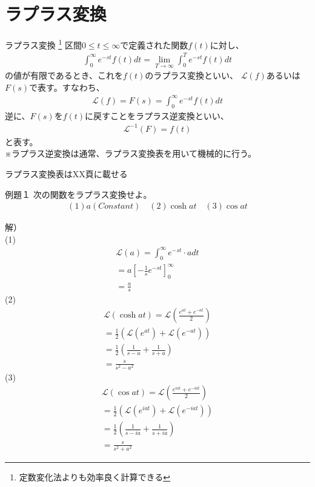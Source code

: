 \documentclass{jsarticle}
\begin{document}
\section{ラプラス変換}
\begin{itembox}[l]{ラプラス変換 \footnote{定数変化法よりも効率良く計算できる}}
区間$0\leq t\leq \infty $で定義された関数$f(t)$に対し、
\begin{eqnarray}
\int_{0}^{\infty}e^{-st}f(t)dt=\lim_{T \to \infty}\int_{0}^{T}e^{-st}f(t)dt
\end{eqnarray}
の値が有限であるとき、これを$f(t)$のラプラス変換といい、
$\mathcal{L}(f)$あるいは$F(s)$で表す。すなわち、
\begin{eqnarray}
\mathcal{L}(f)=F(s)=\int_{0}^{\infty}e^{-st}f(t)dt
\end{eqnarray}
逆に、$F(s)$を$f(t)$に戻すことをラプラス逆変換といい、
\begin{eqnarray}
\mathcal{L}^{-1}(F)=f(t)
\end{eqnarray}
と表す。\\
※ラプラス逆変換は通常、ラプラス変換表を用いて機械的に行う。
\end{itembox}
ラプラス変換表はXX頁に載せる\\
\begin{itembox}[l]{例題１}
次の関数をラプラス変換せよ。
\begin{eqnarray}
(1)a(Constant) \quad
(2)\cosh at \quad
(3)\cos at
\end{eqnarray}
\end{itembox}
解）\\
(1)
\begin{eqnarray}
\mathcal{L}(a)=\int_{0}^{\infty}e^{-st}\cdot adt\\
=a\left[-\frac{1}{s}e^{-st}\right]_{0}^{\infty}\\
=\frac{a}{s}
\end{eqnarray}
(2)
\begin{eqnarray}
\mathcal{L}(\cosh at)=\mathcal{L}\left(\frac{e^{at}+e^{-at}}{2}\right)\\
=\frac{1}{2}(\mathcal{L}(e^{at})+\mathcal{L}(e^{-at}))\\
=\frac{1}{2}\left(\frac{1}{s-a}+\frac{1}{s+a}\right)\\
=\frac{s}{s^2-a^2}
\end{eqnarray}
(3)
\begin{eqnarray}
\mathcal{L}(\cos at)=\mathcal{L}\left(\frac{e^{iat}+e^{-iat}}{2}\right)\\
=\frac{1}{2}(\mathcal{L}(e^{iat})+\mathcal{L}(e^{-iat}))\\
=\frac{1}{2}\left(\frac{1}{s-ia}+\frac{1}{s+ia}\right)\\
=\frac{s}{s^2+a^2}
\end{eqnarray}
\end{document}
